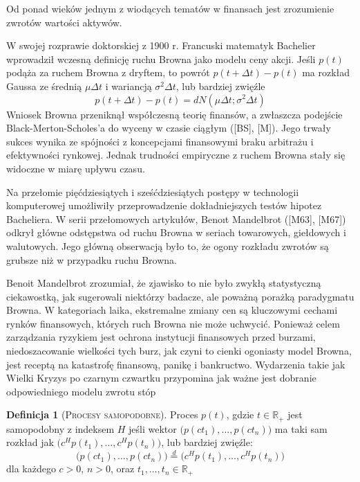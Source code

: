 \documentclass[12pt]{article}
\theoremstyle{definition}
\newtheorem{definition}{Definicja}[section]
\begin{document}
Od ponad wieków jednym z wiodących tematów w finansach jest zrozumienie zwrotów wartości aktywów.

W swojej rozprawie doktorskiej z 1900 r. Francuski matematyk Bachelier wprowadził wczesną definicję ruchu Browna jako modelu ceny akcji. %
Jeśli $p(t)$ podąża za ruchem Browna z dryftem, to powrót $p(t + \Delta t) - p (t)$ ma rozkład Gaussa ze średnią $\mu \Delta t$ i wariancją $\sigma ^2 \Delta t$, lub bardziej zwięźle
$$p(t + \Delta t) -p(t) = dN(\mu \Delta t; \sigma ^2 \Delta t)$$
Wniosek Browna przeniknął współczesną teorię finansów, a zwłaszcza podejście Black-Merton-Scholes'a do wyceny w czasie ciągłym ([BS], [M]). Jego trwały sukces wynika ze spójności z koncepcjami finansowymi braku arbitrażu i efektywności rynkowej. Jednak trudności empiryczne z ruchem Browna stały się widoczne w miarę upływu czasu.

Na przełomie pięćdziesiątych i sześćdziesiątych postępy w technologii komputerowej umożliwiły przeprowadzenie dokładniejszych testów hipotez Bacheliera. W serii przełomowych artykułów, Benoıt Mandelbrot ([M63], [M67]) odkrył główne odstępstwa od ruchu Browna w seriach towarowych, giełdowych i walutowych. Jego główną obserwacją było to, że ogony rozkładu zwrotów są grubsze niż w przypadku ruchu Browna.

Benoit Mandelbrot zrozumiał, że zjawisko to nie było zwykłą statystyczną ciekawostką, jak sugerowali niektórzy badacze, ale poważną porażką paradygmatu Browna. W kategoriach laika, ekstremalne zmiany cen są kluczowymi cechami rynków finansowych, których ruch Browna nie może uchwycić. Ponieważ celem zarządzania ryzykiem jest ochrona instytucji finansowych przed burzami, niedoszacowanie wielkości tych burz, jak czyni to cienki ogoniasty model Browna, jest receptą na katastrofę finansową, panikę i bankructwo.
Wydarzenia takie jak Wielki Kryzys po czarnym czwartku przypomina jak ważne jest dobranie odpowiedniego modelu zwrotu stóp %

\begin{definition}[\textsc{Procesy samopodobne}] 
Proces $p(t)$, gdzie $t \in \mathbb{R}_{+}$ jest samopodobny z indeksem $H$ jeśli wektor $\big(p(ct_1),\ldots,p(ct_n)\big)$ ma taki sam rozkład jak $\big(c^H p(t_1),\ldots, c^H p(t_n)\big)$, lub bardziej zwięźle: 
\begin{equation}
\label{eq:1}
\big( p(ct_1),\ldots,p(ct_n) \big) \stackrel{d}{=} \big(c^H p(t_1),\ldots, c^H p(t_n)\big)
\end{equation}
dla każdego $c>0$, $n>0$, oraz $t_1,\ldots ,t_n \in \mathbb{R}_{+}$
\end{definition}
\end{document}
